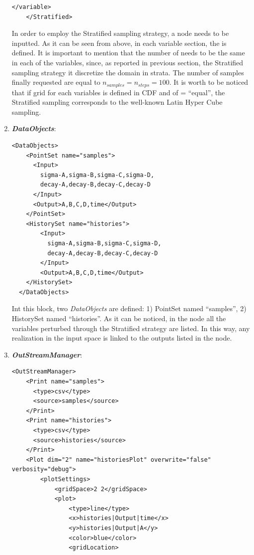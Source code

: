 \begin{enumerate}
\begin{lstlisting}[style=XML,morekeywords={arg,extension,pauseAtEnd,overwrite}]
      </variable>
    </Stratified> 
\end{lstlisting}
  In order to employ the Stratified sampling strategy, a 
   node needs to be inputted. As it can be
  seen from above, in each variable section, the   is defined. 
  It is important to mention that the number of  needs to be the same in each of the variables,
  since, as reported in previous section, the Stratified sampling strategy it discretize the domain in strata. 
  The number of samples finally requested are equal to $n_{samples} = n_{steps} = 100$.
  It is worth to be noticed that if grid for each variables is defined in CDF and of   = ``equal'', the Stratified
  sampling corresponds to the well-known Latin Hyper Cube sampling.
   \item \textbf{\textit{DataObjects}}:
\begin{lstlisting}[style=XML,morekeywords={arg,extension,pauseAtEnd,overwrite}]
  <DataObjects>
    <PointSet name="samples">
      <Input>
        sigma-A,sigma-B,sigma-C,sigma-D,
        decay-A,decay-B,decay-C,decay-D
      </Input>
      <Output>A,B,C,D,time</Output>
    </PointSet>
    <HistorySet name="histories">
        <Input>
          sigma-A,sigma-B,sigma-C,sigma-D,
          decay-A,decay-B,decay-C,decay-D
        </Input>
        <Output>A,B,C,D,time</Output>
    </HistorySet>
  </DataObjects>
\end{lstlisting}
  Int this block, two \textit{DataObjects} are defined: 1) PointSet named 
  ``samples'', 2) HistorySet named ``histories''.
  As it can be noticed, in the  node all the variables 
  perturbed through the Stratified strategy are listed. In this way, any
  realization in the input space is linked to the outputs listed in  the 
   node.
   \item \textbf{\textit{OutStreamManager}}:   
\begin{lstlisting}[style=XML,morekeywords={arg,extension,pauseAtEnd,overwrite}]
  <OutStreamManager>
    <Print name="samples">
      <type>csv</type>
      <source>samples</source>
    </Print>
    <Print name="histories">
      <type>csv</type>
      <source>histories</source>
    </Print>
    <Plot dim="2" name="historiesPlot" overwrite="false" verbosity="debug">
        <plotSettings>
            <gridSpace>2 2</gridSpace>
            <plot>
                <type>line</type>
                <x>histories|Output|time</x>
                <y>histories|Output|A</y>
                <color>blue</color>
                <gridLocation>

\end{lstlisting}
\end{enumerate}
